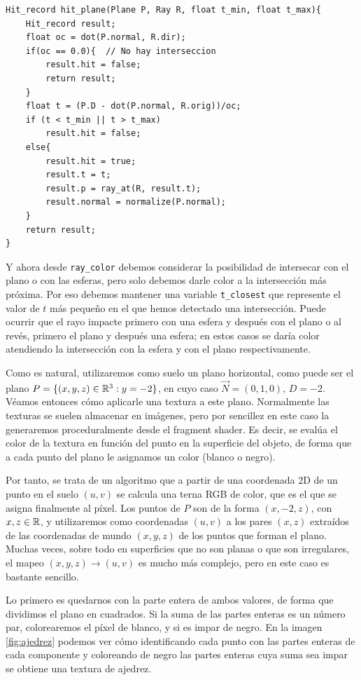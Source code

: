 \begin{lstlisting}
Hit_record hit_plane(Plane P, Ray R, float t_min, float t_max){
    Hit_record result;
    float oc = dot(P.normal, R.dir);
    if(oc == 0.0){  // No hay interseccion
        result.hit = false;
        return result;
    }
    float t = (P.D - dot(P.normal, R.orig))/oc;
    if (t < t_min || t > t_max)
        result.hit = false;
    else{
        result.hit = true;
        result.t = t;
        result.p = ray_at(R, result.t);
        result.normal = normalize(P.normal);
    }
    return result;
}
\end{lstlisting}

Y ahora desde \verb|ray_color| debemos considerar la posibilidad de intersecar con el plano o con las esferas, pero solo debemos darle color a la intersección más próxima. Por eso debemos mantener una variable \verb|t_closest| que represente el valor de $t$ más pequeño en el que hemos detectado una intersección. Puede ocurrir que el rayo impacte primero con una esfera y después con el plano o al revés, primero el plano y después una esfera; en estos casos se daría color atendiendo la intersección con la esfera y con el plano respectivamente. 

Como es natural, utilizaremos como suelo un plano horizontal, como puede ser el plano $P=\{(x,y,z)\in\mathbb{R}^3:y=-2\}$, en cuyo caso $\vec N=(0,1,0)$, $D=-2$. Véamos entonces cómo aplicarle una textura a este plano. Normalmente las texturas se suelen almacenar en imágenes, pero por sencillez en este caso la generaremos proceduralmente desde el fragment shader. Es decir, se evalúa el color de la textura en función del punto en la superficie del objeto, de forma que a cada punto del plano le asignamos un color (blanco o negro). 

Por tanto, se trata de un algoritmo que a partir de una coordenada 2D de un punto en el suelo $(u,v)$ se calcula una terna RGB de color, que es el que se asigna finalmente al píxel. Los puntos de $P$ son de la forma $(x,-2,z)$, con $ x,z\in\mathbb{R}$, y utilizaremos como coordenadas $(u,v)$ a los pares $(x,z)$ extraídos de las coordenadas de mundo $(x,y,z)$ de los puntos que forman el plano. Muchas veces, sobre todo en superficies que no son planas o que son irregulares, el mapeo $(x,y,z)\longrightarrow(u,v)$ es mucho más complejo, pero en este caso es bastante sencillo.

Lo primero es quedarnos con la parte entera de ambos valores, de forma que dividimos el plano en cuadrados. Si la suma de las partes enteras es un número par, colorearemos el píxel de blanco, y si es impar de negro. En la imagen \ref{fig:ajedrez} podemos ver cómo identificando cada punto con las partes enteras de cada componente y coloreando de negro las partes enteras cuya suma sea impar se obtiene una textura de ajedrez.

